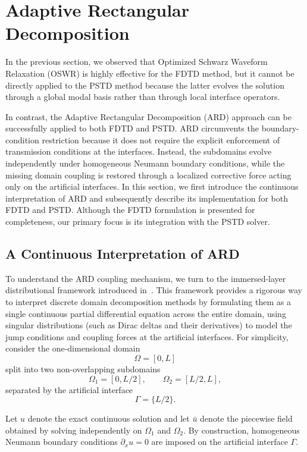 \documentclass{Configuration_Files/PoliMi3i_thesis}
\begin{document}
\section{Adaptive Rectangular Decomposition}
\label{sec:ard}

In the previous section, we observed that Optimized Schwarz Waveform Relaxation (OSWR) is highly effective for the FDTD method, but it cannot be directly applied to the PSTD method because the latter evolves the solution through a global modal basis rather than through local interface operators.

In contrast, the Adaptive Rectangular Decomposition (ARD) approach can be successfully applied to both FDTD and PSTD. ARD circumvents the boundary-condition restriction because it does not require the explicit enforcement of transmission conditions at the interfaces. Instead, the subdomains evolve independently under homogeneous Neumann boundary conditions, while the missing domain coupling is restored through a localized corrective force acting only on the artificial interfaces. In this section, we first introduce the continuous interpretation of ARD and subsequently describe its implementation for both FDTD and PSTD. Although the FDTD formulation is presented for completeness, our primary focus is its integration with the PSTD solver.

\subsection{A Continuous Interpretation of ARD}

To understand the ARD coupling mechanism, we turn to the immersed-layer distributional framework introduced in~\cite{eldredge_method_2022}. This framework provides a rigorous way to interpret discrete domain decomposition methods by formulating them as a single continuous partial differential equation across the entire domain, using singular distributions (such as Dirac deltas and their derivatives) to model the jump conditions and coupling forces at the artificial interfaces. For simplicity, consider the one-dimensional domain
\[
\Omega=[0,L]
\]
split into two non-overlapping subdomains
\[
\Omega_1=[0,L/2],\qquad
\Omega_2=[L/2,L],
\]
separated by the artificial interface
\[
\Gamma=\{L/2\}.
\]

Let $u$ denote the exact continuous solution and let $\bar u$ denote the piecewise field obtained by solving independently on $\Omega_1$ and $\Omega_2$. By construction, homogeneous Neumann boundary conditions $\partial_x u = 0$ are imposed on the artificial interface $\Gamma$.
\end{document}
